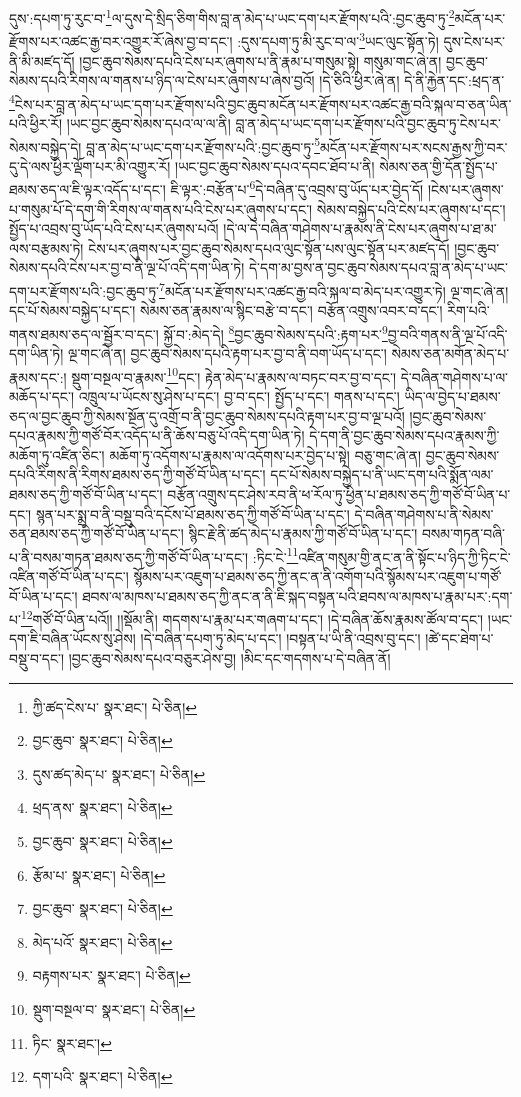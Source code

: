 དུས་:དཔག་ཏུ་རུང་བ་\footnote{ཀྱི་ཚད་ངེས་པ་  སྣར་ཐང་།  པེ་ཅིན། }ལ་དུས་དེ་སྲིད་ཅིག་གིས་བླ་ན་མེད་པ་ཡང་དག་པར་རྫོགས་པའི་:བྱང་ཆུབ་ཏུ་\footnote{བྱང་ཆུབ་  སྣར་ཐང་།  པེ་ཅིན། }མངོན་པར་རྫོགས་པར་འཚང་རྒྱ་བར་འགྱུར་རོ་ཞེས་བྱ་བ་དང་། :དུས་དཔག་ཏུ་མི་རུང་བ་ལ་\footnote{དུས་ཚད་མེད་པ་  སྣར་ཐང་།  པེ་ཅིན། }ཡང་ལུང་སྟོན་ཏེ། དུས་ངེས་པར་ནི་མི་མཛད་དོ། །བྱང་ཆུབ་སེམས་དཔའི་ངེས་པར་ཞུགས་པ་ནི་རྣམ་པ་གསུམ་སྟེ། གསུམ་གང་ཞེ་ན། བྱང་ཆུབ་སེམས་དཔའི་རིགས་ལ་གནས་པ་ཉིད་ལ་ངེས་པར་ཞུགས་པ་ཞེས་བྱའོ། །དེ་ཅིའི་ཕྱིར་ཞེ་ན། དེ་ནི་རྐྱེན་དང་:ཕྲད་ན་\footnote{ཕྲད་ནས་  སྣར་ཐང་།  པེ་ཅིན། }ངེས་པར་བླ་ན་མེད་པ་ཡང་དག་པར་རྫོགས་པའི་བྱང་ཆུབ་མངོན་པར་རྫོགས་པར་འཚང་རྒྱ་བའི་སྐལ་བ་ཅན་ཡིན་པའི་ཕྱིར་རོ། །ཡང་བྱང་ཆུབ་སེམས་དཔའ་ལ་ལ་ནི། བླ་ན་མེད་པ་ཡང་དག་པར་རྫོགས་པའི་བྱང་ཆུབ་ཏུ་ངེས་པར་སེམས་བསྐྱེད་དེ། བླ་ན་མེད་པ་ཡང་དག་པར་རྫོགས་པའི་:བྱང་ཆུབ་ཏུ་\footnote{བྱང་ཆུབ་  སྣར་ཐང་།  པེ་ཅིན། }མངོན་པར་རྫོགས་པར་སངས་རྒྱས་ཀྱི་བར་དུ་དེ་ལས་ཕྱིར་ལྡོག་པར་མི་འགྱུར་རོ། །ཡང་བྱང་ཆུབ་སེམས་དཔའ་དབང་ཐོབ་པ་ནི། སེམས་ཅན་གྱི་དོན་སྤྱོད་པ་ཐམས་ཅད་ལ་ཇི་ལྟར་འདོད་པ་དང་། ཇི་ལྟར་:བརྩོན་པ་\footnote{རྩོམ་པ་  སྣར་ཐང་།  པེ་ཅིན། }དེ་བཞིན་དུ་འབྲས་བུ་ཡོད་པར་བྱེད་དོ། །ངེས་པར་ཞུགས་པ་གསུམ་པོ་དེ་དག་གི་རིགས་ལ་གནས་པའི་ངེས་པར་ཞུགས་པ་དང་། སེམས་བསྐྱེད་པའི་ངེས་པར་ཞུགས་པ་དང་། སྤྱོད་པ་འབྲས་བུ་ཡོད་པའི་ངེས་པར་ཞུགས་པའོ། །དེ་ལ་དེ་བཞིན་གཤེགས་པ་རྣམས་ནི་ངེས་པར་ཞུགས་པ་ཐ་མ་ལས་བརྩམས་ཏེ། ངེས་པར་ཞུགས་པར་བྱང་ཆུབ་སེམས་དཔའ་ལུང་སྟོན་པས་ལུང་སྟོན་པར་མཛད་དོ། །བྱང་ཆུབ་སེམས་དཔའི་ངེས་པར་བྱ་བ་ནི་ལྔ་པོ་འདི་དག་ཡིན་ཏེ། དེ་དག་མ་བྱས་ན་བྱང་ཆུབ་སེམས་དཔའ་བླ་ན་མེད་པ་ཡང་དག་པར་རྫོགས་པའི་:བྱང་ཆུབ་ཏུ་\footnote{བྱང་ཆུབ་  སྣར་ཐང་།  པེ་ཅིན། }མངོན་པར་རྫོགས་པར་འཚང་རྒྱ་བའི་སྐལ་བ་མེད་པར་འགྱུར་ཏེ། ལྔ་གང་ཞེ་ན། དང་པོ་སེམས་བསྐྱེད་པ་དང་། སེམས་ཅན་རྣམས་ལ་སྙིང་བརྩེ་བ་དང་། བརྩོན་འགྲུས་འབར་བ་དང་། རིག་པའི་གནས་ཐམས་ཅད་ལ་སྦྱོར་བ་དང་། སྐྱོ་བ་:མེད་དེ། \footnote{མེད་པའོ་  སྣར་ཐང་།  པེ་ཅིན། }བྱང་ཆུབ་སེམས་དཔའི་:རྟག་པར་\footnote{བརྟགས་པར་  སྣར་ཐང་།  པེ་ཅིན། }བྱ་བའི་གནས་ནི་ལྔ་པོ་འདི་དག་ཡིན་ཏེ། ལྔ་གང་ཞེ་ན། བྱང་ཆུབ་སེམས་དཔའི་རྟག་པར་བྱ་བ་ནི་བག་ཡོད་པ་དང་། སེམས་ཅན་མགོན་མེད་པ་རྣམས་དང་:། སྡུག་བསྔལ་བ་རྣམས་\footnote{སྡུག་བསྔལ་བ་  སྣར་ཐང་།  པེ་ཅིན། }དང་། རྟེན་མེད་པ་རྣམས་ལ་བཏང་བར་བྱ་བ་དང་། དེ་བཞིན་གཤེགས་པ་ལ་མཆོད་པ་དང་། འཁྲུལ་པ་ཡོངས་སུ་ཤེས་པ་དང་། བྱ་བ་དང་། སྤྱོད་པ་དང་། གནས་པ་དང་། ཡིད་ལ་བྱེད་པ་ཐམས་ཅད་ལ་བྱང་ཆུབ་ཀྱི་སེམས་སྔོན་དུ་འགྲོ་བ་ནི་བྱང་ཆུབ་སེམས་དཔའི་རྟག་པར་བྱ་བ་ལྔ་པའོ། །བྱང་ཆུབ་སེམས་དཔའ་རྣམས་ཀྱི་གཙོ་བོར་འདོད་པ་ནི་ཆོས་བཅུ་པོ་འདི་དག་ཡིན་ཏེ། དེ་དག་ནི་བྱང་ཆུབ་སེམས་དཔའ་རྣམས་ཀྱི་མཆོག་ཏུ་འཛིན་ཅིང་། མཆོག་ཏུ་འདོགས་པ་རྣམས་ལ་འདོགས་པར་བྱེད་པ་སྟེ། བཅུ་གང་ཞེ་ན། བྱང་ཆུབ་སེམས་དཔའི་རིགས་ནི་རིགས་ཐམས་ཅད་ཀྱི་གཙོ་བོ་ཡིན་པ་དང་། དང་པོ་སེམས་བསྐྱེད་པ་ནི་ཡང་དག་པའི་སྨོན་ལམ་ཐམས་ཅད་ཀྱི་གཙོ་བོ་ཡིན་པ་དང་། བརྩོན་འགྲུས་དང་ཤེས་རབ་ནི་ཕ་རོལ་ཏུ་ཕྱིན་པ་ཐམས་ཅད་ཀྱི་གཙོ་བོ་ཡིན་པ་དང་། སྙན་པར་སྨྲ་བ་ནི་བསྡུ་བའི་དངོས་པོ་ཐམས་ཅད་ཀྱི་གཙོ་བོ་ཡིན་པ་དང་། དེ་བཞིན་གཤེགས་པ་ནི་སེམས་ཅན་ཐམས་ཅད་ཀྱི་གཙོ་བོ་ཡིན་པ་དང་། སྙིང་རྗེ་ནི་ཚད་མེད་པ་རྣམས་ཀྱི་གཙོ་བོ་ཡིན་པ་དང་། བསམ་གཏན་བཞི་པ་ནི་བསམ་གཏན་ཐམས་ཅད་ཀྱི་གཙོ་བོ་ཡིན་པ་དང་། :ཏིང་ངེ་\footnote{ཏིང་  སྣར་ཐང་། }འཛིན་གསུམ་གྱི་ནང་ན་ནི་སྟོང་པ་ཉིད་ཀྱི་ཏིང་ངེ་འཛིན་གཙོ་བོ་ཡིན་པ་དང་། སྙོམས་པར་འཇུག་པ་ཐམས་ཅད་ཀྱི་ནང་ན་ནི་འགོག་པའི་སྙོམས་པར་འཇུག་པ་གཙོ་བོ་ཡིན་པ་དང་། ཐབས་ལ་མཁས་པ་ཐམས་ཅད་ཀྱི་ནང་ན་ནི་ཇི་སྐད་བསྟན་པའི་ཐབས་ལ་མཁས་པ་རྣམ་པར་:དག་པ་\footnote{དག་པའི་  སྣར་ཐང་།  པེ་ཅིན། }གཙོ་བོ་ཡིན་པའོ།། །།སྡོམ་ནི། གདགས་པ་རྣམ་པར་གཞག་པ་དང་། །དེ་བཞིན་ཆོས་རྣམས་ཚོལ་བ་དང་། །ཡང་དག་ཇི་བཞིན་ཡོངས་སུ་ཤེས། །དེ་བཞིན་དཔག་ཏུ་མེད་པ་དང་། །བསྟན་པ་ཡི་ནི་འབྲས་བུ་དང་། །ཚེ་དང་ཐེག་པ་བསྡུ་བ་དང་། །བྱང་ཆུབ་སེམས་དཔའ་བཅུར་ཤེས་བྱ། །མིང་དང་གདགས་པ་དེ་བཞིན་ནོ། 